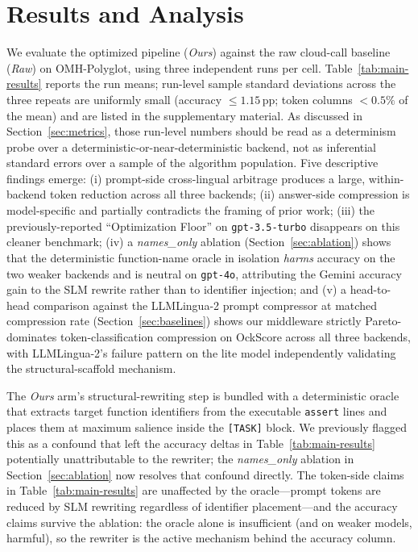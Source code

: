 \documentclass[11pt,a4paper,twocolumn]{article}
\begin{document}
\section{Results and Analysis}
\label{sec:results}
We evaluate the optimized pipeline (\textit{Ours}) against the raw cloud-call baseline (\textit{Raw}) on OMH-Polyglot, using three independent runs per cell. Table~\ref{tab:main-results} reports the run means; run-level sample standard deviations across the three repeats are uniformly small (accuracy $\le 1.15$\,pp; token columns $<0.5\%$ of the mean) and are listed in the supplementary material. As discussed in Section~\ref{sec:metrics}, those run-level numbers should be read as a determinism probe over a deterministic-or-near-deterministic backend, not as inferential standard errors over a sample of the algorithm population. Five descriptive findings emerge: (i) prompt-side cross-lingual arbitrage produces a large, within-backend token reduction across all three backends; (ii) answer-side compression is model-specific and partially contradicts the framing of prior work; (iii) the previously-reported ``Optimization Floor'' on \texttt{gpt-3.5-turbo} disappears on this cleaner benchmark; (iv) a \textit{names\_only} ablation (Section~\ref{sec:ablation}) shows that the deterministic function-name oracle in isolation \emph{harms} accuracy on the two weaker backends and is neutral on \texttt{gpt-4o}, attributing the Gemini accuracy gain to the SLM rewrite rather than to identifier injection; and (v) a head-to-head comparison against the LLMLingua-2 prompt compressor at matched compression rate (Section~\ref{sec:baselines}) shows our middleware strictly Pareto-dominates token-classification compression on OckScore across all three backends, with LLMLingua-2's failure pattern on the lite model independently validating the structural-scaffold mechanism.

The \textit{Ours} arm's structural-rewriting step is bundled with a deterministic oracle that extracts target function identifiers from the executable \texttt{assert} lines and places them at maximum salience inside the \texttt{[TASK]} block. We previously flagged this as a confound that left the accuracy deltas in Table~\ref{tab:main-results} potentially unattributable to the rewriter; the \textit{names\_only} ablation in Section~\ref{sec:ablation} now resolves that confound directly. The token-side claims in Table~\ref{tab:main-results} are unaffected by the oracle---prompt tokens are reduced by SLM rewriting regardless of identifier placement---and the accuracy claims survive the ablation: the oracle alone is insufficient (and on weaker models, harmful), so the rewriter is the active mechanism behind the accuracy column.
\end{document}
